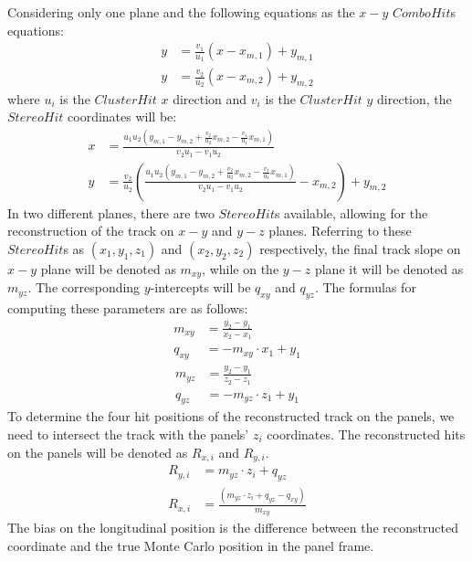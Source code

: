 Considering only one plane and the following 
equations as the $x-y$ $ComboHit$s equations:
\begin{equation}
    \begin{aligned}
        y&=\frac{v_1}{u_1}(x-x_{m,1})+y_{m,1} \\
        y&=\frac{v_2}{u_2}(x-x_{m,2})+y_{m,2} 
    \end{aligned}
    \end{equation}
where $u_i$ is the $ClusterHit$ $x$ direction and $v_i$ is the $ClusterHit$ $y$ direction, the $StereoHit$ coordinates will be:
\begin{equation}\label{x}
    \begin{aligned}
x&=\frac{u_1 u_2(y_{m,1}-y_{m,2}+\frac{v_2}{u_2}x_{m,2}-\frac{v_1}{u_1}x_{m,1})}{v_2 u_1 - v_1 u_2}\\
y&=\frac{v_2}{u_2}\left(\frac{u_1 u_2(y_{m,1}-y_{m,2}+\frac{v_2}{u_2}x_{m,2}-\frac{v_1}{u_1}x_{m,1})}{v_2 u_1 - v_1 u_2}-x_{m,2}\right)+y_{m,2}
\end{aligned}
\end{equation}
In two different planes, there are two $StereoHit$s available, allowing for the reconstruction of the track on $x-y$ and $y-z$ planes. 
Referring to these $StereoHit$s as $(x_1,y_1,z_1)$ and $(x_2,y_2,z_2)$ respectively, the final track slope on $x-y$ plane will be 
denoted as $m_{xy}$, while on the $y-z$ plane it will be denoted as $m_{yz}$. The corresponding $y$-intercepts will be $q_{xy}$ and $q_{yz}$.
The formulas for computing these parameters are as follows:
\begin{equation}
    \begin{aligned}
m_{xy}&=\frac{y_2-y_1}{x_2-x_1}\\
q_{xy}&=-m_{xy} \cdot x_1+y_1
\end{aligned}
\end{equation}
\begin{equation}
    \begin{aligned}
m_{yz}&=\frac{y_2-y_1}{z_2-z_1}\\
q_{yz}&=-m_{yz} \cdot z_1+y_1
\end{aligned}
\end{equation}
To determine the four hit positions of the reconstructed track on the panels, we need to intersect the track with the panels' $z_i$ coordinates. 
The reconstructed hits on the panels will be denoted as $R_{x,i}$ and $R_{y,i}$.
\begin{equation}
    \begin{aligned}
 R_{y,i}&=m_{yz}\cdot z_i+q_{yz}\\
 R_{x,i}&=\frac{(m_{yz}\cdot z_i+q_{yz}-q_{xy})}{m_{xy}}
\end{aligned}
\end{equation}
The bias on the longitudinal position is the difference between the reconstructed coordinate and the true Monte Carlo position in the panel frame.

